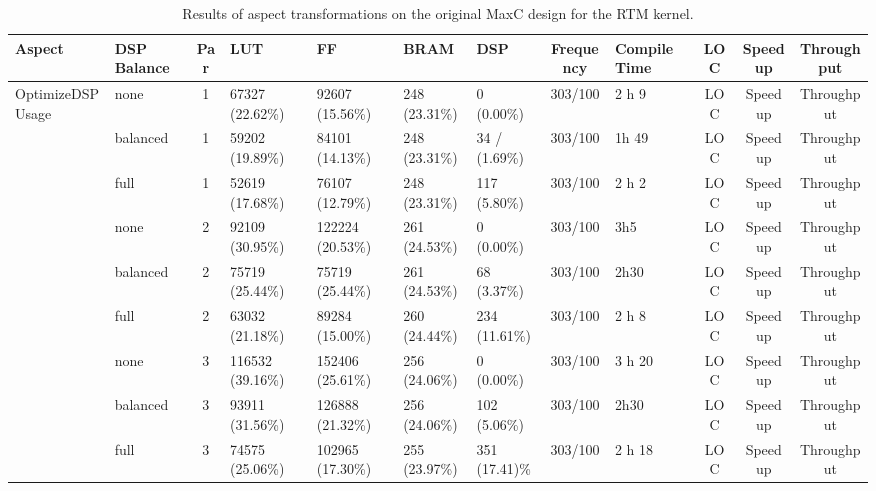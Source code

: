 \lstset{style=MaxC}


\begin{table}
  \centering
  \caption{Results of aspect transformations on the original MaxC
    design for the RTM kernel.}
  \label{table:feature-comparison}
  \begin{tabular}{ p{2cm}  | p{1cm} | c|  p{1cm} |  p{1cm} |  p{1cm} |  p{1cm} | c | p{1cm} |c | c | c}
   Aspect                           & DSP Balance    & Par & LUT               & FF                & BRAM           & DSP            & Frequency & Compile Time & LOC & Speedup & Throughput \\ \hline
  \multirow{4}{*}{OptimizeDSPUsage} & none           & 1   & 67327 (22.62\%)   & 92607  (15.56\%)  & 248 (23.31\%)  & 0  (0.00\%)    & 303/100   & 2 h 9        & LOC & Speedup & Throughput \\
                                    & balanced       & 1   & 59202 (19.89\%)   & 84101 (14.13\%)   & 248 (23.31\%)  & 34 / (1.69\%)  & 303/100   & 1h 49        & LOC & Speedup & Throughput \\
                                    & full           & 1   & 52619  (17.68\%)  & 76107  (12.79\%)  & 248  (23.31\%) & 117  (5.80\%)  & 303/100   & 2 h 2        & LOC & Speedup & Throughput \\ \hline
                                    & none           & 2   & 92109 (30.95\%)   & 122224 (20.53\%)  & 261 (24.53\%)  & 0 (0.00\%)     & 303/100   & 3h5          & LOC & Speedup & Throughput \\
                                    & balanced       & 2   & 75719 (25.44\%)   & 75719 (25.44\%)   & 261 (24.53\%)  & 68 (3.37\%)    & 303/100   & 2h30         & LOC & Speedup & Throughput \\
                                    & full           & 2   & 63032  (21.18\%)  & 89284  (15.00\%)  & 260  (24.44\%) & 234  (11.61\%) & 303/100   & 2 h 8        & LOC & Speedup & Throughput \\
\hline
                                    & none           & 3   & 116532 (39.16\%)  & 152406 (25.61\%)  & 256 (24.06\%)  & 0 (0.00\%)     & 303/100   & 3 h 20       & LOC & Speedup & Throughput \\
                                    & balanced       & 3   & 93911 (31.56\%)   & 126888 (21.32\%)  & 256 (24.06\%)  & 102 (5.06\%)   & 303/100   & 2h30         & LOC & Speedup & Throughput \\
                                    & full           & 3   & 74575  (25.06\%)  & 102965  (17.30\%) & 255  (23.97\%) & 351  (17.41)\% & 303/100   & 2 h 18       & LOC & Speedup & Throughput \\

\end{tabular}
\end{table}
